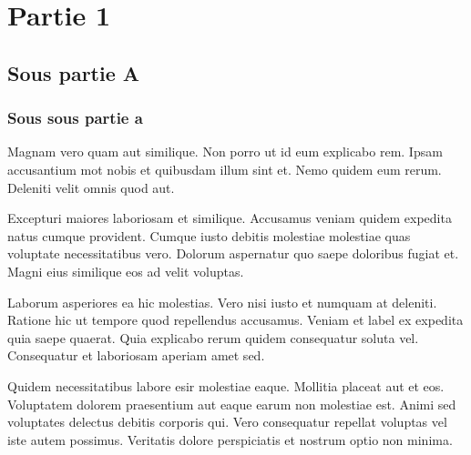 \section{Partie 1}
\subsection{Sous partie A}
\subsubsection{Sous sous partie a}

Magnam vero quam aut similique. Non porro ut id eum explicabo rem. Ipsam accusantium \gls{mot} nobis et quibusdam illum sint et. Nemo quidem eum rerum. Deleniti velit omnis quod aut.

Excepturi maiores laboriosam et similique. Accusamus veniam quidem expedita natus cumque provident. Cumque iusto debitis molestiae molestiae quas voluptate\cite{smith1920article} necessitatibus vero. Dolorum aspernatur quo saepe doloribus fugiat et. Magni eius similique eos ad velit voluptas.

Laborum asperiores ea hic molestias. Vero nisi iusto et numquam at deleniti. Ratione hic ut tempore quod repellendus accusamus. Veniam et \gls{label} ex expedita quia saepe quaerat. Quia explicabo rerum quidem consequatur soluta vel. Consequatur et laboriosam aperiam amet sed.

Quidem necessitatibus labore \gls{esir} molestiae eaque. Mollitia placeat aut et eos. Voluptatem dolorem praesentium aut eaque earum non molestiae est. Animi sed voluptates\cite{gltransform} delectus debitis corporis qui. Vero consequatur repellat voluptas vel iste autem possimus. Veritatis dolore perspiciatis et nostrum optio non minima.


